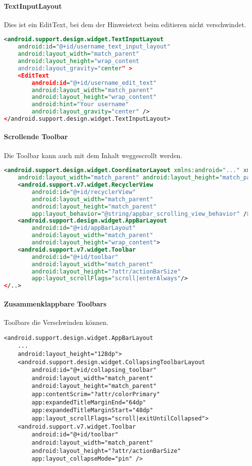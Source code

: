 \paragraph{TextInputLayout} Dies ist ein EditText, bei dem der Hinweistext beim editieren nicht verschwindet.
\begin{lstlisting}[language=xml]
<android.support.design.widget.TextInputLayout
    android:id="@+id/username_text_input_layout"
    android:layout_width="match_parent"
    android:layout_height="wrap_content
    android:layout_gravity="center" >
    <EditText
        android:id="@+id/username_edit_text"
        android:layout_width="match_parent"
        android:layout_height="wrap_content"
        android:hint="Your username"
        android:layout_gravity="center" />
</android.support.design.widget.TextInputLayout>
\end{lstlisting}
\paragraph{Scrollende Toolbar} Die Toolbar kann auch mit dem Inhalt weggescrollt werden. 
\begin{lstlisting}[language=xml]
<android.support.design.widget.CoordinatorLayout xmlns:android="..." xmlns:app="..."
    android:layout_width="match_parent" android:layout_height="match_parent">
    <android.support.v7.widget.RecyclerView
        android:id="@+id/recyclerView"
        android:layout_width="match_parent"
        android:layout_height="match_parent"
        app:layout_behavior="@string/appbar_scrolling_view_behavior" />
    <android.support.design.widget.AppBarLayout
        android:id="@+id/appBarLayout"
        android:layout_width="match_parent"
        android:layout_height="wrap_content">
    <android.support.v7.widget.Toolbar
        android:id="@+id/toolbar"
        android:layout_width="match_parent"
        android:layout_height="?attr/actionBarSize"
        app:layout_scrollFlags="scroll|enterAlways"/>
</..>
\end{lstlisting}
\paragraph{Zusammenklappbare Toolbars} Toolbars die Verschwinden können.
\begin{lstlisting}
<android.support.design.widget.AppBarLayout
    ...
    android:layout_height="128dp">
    <android.support.design.widget.CollapsingToolbarLayout
        android:id="@+id/collapsing_toolbar"
        android:layout_width="match_parent"
        android:layout_height="match_parent"
        app:contentScrim="?attr/colorPrimary"
        app:expandedTitleMarginEnd="64dp"
        app:expandedTitleMarginStart="48dp"
        app:layout_scrollFlags="scroll|exitUntilCollapsed">
    <android.support.v7.widget.Toolbar
        android:id="@+id/toolbar"
        android:layout_width="match_parent"
        android:layout_height="?attr/actionBarSize"
        app:layout_collapseMode="pin" />
\end{lstlisting}
